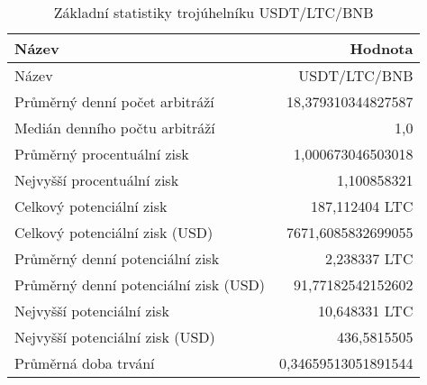 \begin{table}\centering
\caption{Základní statistiky trojúhelníku USDT/LTC/BNB}
\label{USDTLTCBNB_stats}
\begin{tabular}{|| l | r ||}
\hline Název & Hodnota \\ 
\hline\hline Název & USDT/LTC/BNB \\ 
\hline Průměrný denní počet arbitráží & 18,379310344827587 \\ 
\hline Medián denního počtu arbitráží & 1,0 \\ 
\hline Průměrný procentuální zisk & 1,000673046503018 \\ 
\hline Nejvyšší procentuální zisk & 1,100858321 \\ 
\hline Celkový potenciální zisk & 187,112404 LTC \\ 
\hline Celkový potenciální zisk (USD) & 7671,6085832699055 \\ 
\hline Průměrný denní potenciální zisk & 2,238337 LTC \\ 
\hline Průměrný denní potenciální zisk (USD) & 91,77182542152602 \\ 
\hline Nejvyšší potenciální zisk & 10,648331 LTC \\ 
\hline Nejvyšší potenciální zisk (USD) & 436,5815505 \\ 
\hline Průměrná doba trvání & 0,34659513051891544 \\ 
\hline
\end{tabular}
\end{table}